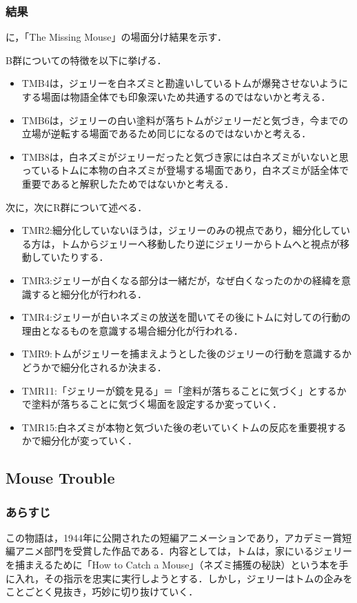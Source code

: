 \subsubsection{結果}
に，「The Missing Mouse」の場面分け結果を示す．

B群についての特徴を以下に挙げる．

\begin{itemize}
	\item TMB4は，ジェリーを白ネズミと勘違いしているトムが爆発させないようにする場面は物語全体でも印象深いため共通するのではないかと考える．
	\item TMB6は，ジェリーの白い塗料が落ちトムがジェリーだと気づき，今までの立場が逆転する場面であるため同じになるのではないかと考える．
	\item TMB8は，白ネズミがジェリーだったと気づき家には白ネズミがいないと思っているトムに本物の白ネズミが登場する場面であり，白ネズミが話全体で重要であると解釈したためではないかと考える．
\end{itemize}
次に，次にR群について述べる．
\begin{itemize}
	\item TMR2:細分化していないほうは，ジェリーのみの視点であり，細分化している方は，トムからジェリーへ移動したり逆にジェリーからトムへと視点が移動していたりする．
	\item TMR3:ジェリーが白くなる部分は一緒だが，なぜ白くなったのかの経緯を意識すると細分化が行われる．
	\item TMR4:ジェリーが白いネズミの放送を聞いてその後にトムに対しての行動の理由となるものを意識する場合細分化が行われる．
	\item TMR9:トムがジェリーを捕まえようとした後のジェリーの行動を意識するかどうかで細分化されるか決まる．
	\item TMR11:「ジェリーが鏡を見る」＝「塗料が落ちることに気づく」とするかで塗料が落ちることに気づく場面を設定するか変っていく．
	\item TMR15:白ネズミが本物と気づいた後の老いていくトムの反応を重要視するかで細分化が変っていく．
\end{itemize}


\subsection{Mouse Trouble}\label{sec:mouse_trouble}
\subsubsection{あらすじ}
この物語は，1944年に公開された\tomjerry の短編アニメーションであり，アカデミー賞短編アニメ部門を受賞した作品である．内容としては，トムは，家にいるジェリーを捕まえるために「How to Catch a Mouse」（ネズミ捕獲の秘訣）という本を手に入れ，その指示を忠実に実行しようとする．しかし，ジェリーはトムの企みをことごとく見抜き，巧妙に切り抜けていく．

